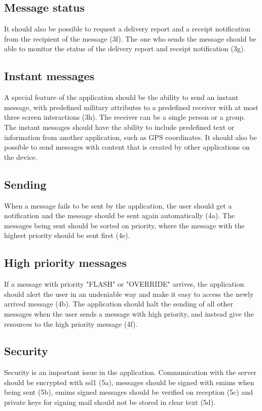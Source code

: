 \subsection{Message status}
It should also be possible to request a delivery report and a receipt notification from the recipient of the message (3f). The one who sends the message should be able to monitor the status of the delivery report and receipt notification (3g).

\subsection{Instant messages}
A special feature of the application should be the ability to send an instant message, with predefined military attributes to a predefined receiver with at most three screen interactions (3h). The receiver can be a single person or a group. The instant messages should have the ability to include predefined text or information from another application, such as GPS coordinates. It should also be possible to send messages with content that is created by other applications on the device.

\subsection{Sending}
When a message fails to be sent by the application, the user should get a notification and the message should be sent again automatically (4a). The messages being sent should be sorted on priority, where the message with the highest priority should be sent first (4e).

\subsection{High priority messages}
If a message with priority "FLASH" or "OVERRIDE" arrives, the application should alert the user in an undeniable way and make it easy to access the newly arrived message (4b). The application should halt the sending of all other messages when the user sends a message with high priority, and instead give the resources to the high priority message (4f).

\subsection{Security}
Security is an important issue in the application. Communication with the server should be encrypted with \gls{ssl1} (5a), messages should be signed with \gls{emims} when being sent (5b), \gls{emims} signed messages should be verified on reception (5c) and private keys for signing mail should not be stored in clear text (5d).

